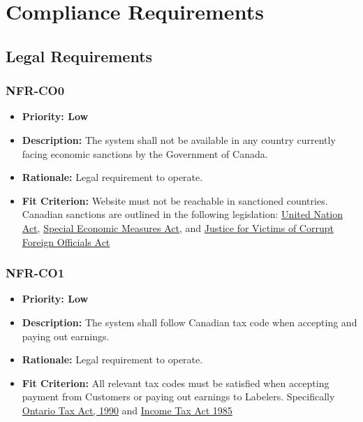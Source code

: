 \documentclass[12pt]{article}
\begin{document}
\section{Compliance Requirements}
\subsection{Legal Requirements}
\subsubsection*{NFR-CO0}
\label{sec:CO0}
\begin{itemize}
  \item \textbf{Priority: Low}
  \item \textbf{Description:} The system shall not be available in any country currently facing economic sanctions by the Government of Canada.
  \item \textbf{Rationale:} Legal requirement to operate.
  \item \textbf{Fit Criterion:} Website must not be reachable in sanctioned countries. Canadian sanctions are outlined in the following legislation: \href{http://laws-lois.justice.gc.ca/eng/acts/U-2/index.html}{United Nation Act}, \href{http://laws-lois.justice.gc.ca/eng/acts/S-14.5/index.html}{Special Economic Measures Act}, and \href{http://laws.justice.gc.ca/eng/acts/J-2.3/}{Justice for Victims of Corrupt Foreign Officials Act}
\end{itemize}
\subsubsection*{NFR-CO1}
\label{sec:CO1}
\begin{itemize}
  \item \textbf{Priority: Low}
  \item \textbf{Description:} The system shall follow Canadian tax code when accepting and paying out earnings.
  \item \textbf{Rationale:} Legal requirement to operate.
  \item \textbf{Fit Criterion:} All relevant tax codes must be satisfied when accepting payment from Customers or paying out earnings to Labelers. Specifically \href{https://www.ontario.ca/laws/statute/90c40}{Ontario Tax Act, 1990} and \href{https://laws-lois.justice.gc.ca/eng/acts/i-3.3/}{Income Tax Act 1985}
\end{itemize}
\end{document}
